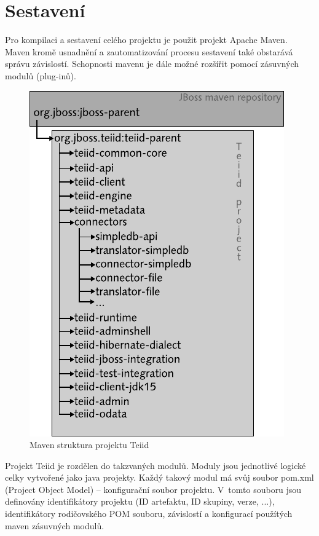 \documentclass[oneside,12pt,final]{fithesis2}
\begin{document}
\section{Sestavení}
Pro kompilaci a sestavení celého projektu je použit projekt Apache Maven. Maven kromě usnadnění a zautomatizování procesu sestavení také obstarává správu závislostí. Schopnosti mavenu je dále možné rozšířit pomocí zásuvných modulů (plug-inů).
\begin{figure}[h]
 \centering
 \includegraphics[scale=1]{mavenStructure}
 \caption{Maven struktura projektu Teiid}
\end{figure}

Projekt Teiid je rozdělen do takzvaných modulů. Moduly jsou jednotlivé logické celky vytvořené jako java projekty. Každý takový modul má svůj soubor pom.xml (Project Object Model) -- konfigurační soubor projektu. V~tomto souboru jsou definovány identifikátory projektu (ID artefaktu, ID skupiny, verze, ...), identifikátory rodičovského POM souboru, závislostí a konfigurací použítých maven zásuvných modulů.
\end{document}
